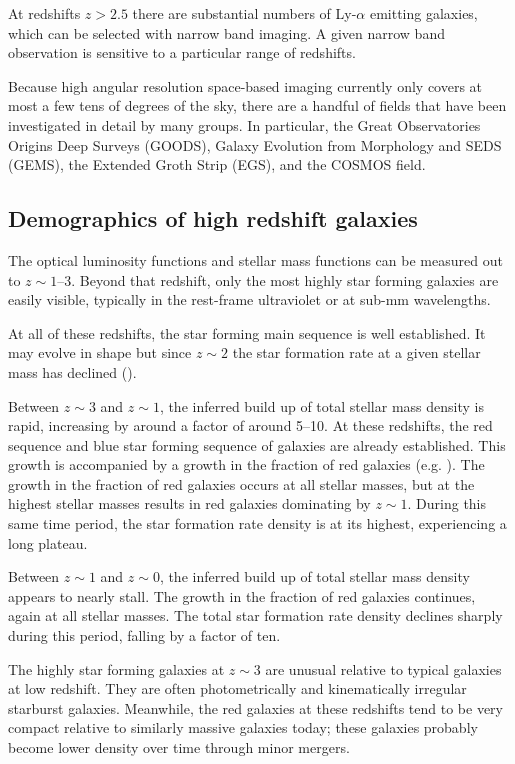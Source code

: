 At redshifts $z>2.5$ there are substantial numbers of Ly-$\alpha$
emitting galaxies, which can be selected with narrow band imaging. A
given narrow band observation is sensitive to a particular range of
redshifts. 

Because high angular resolution space-based imaging currently only
covers at most a few tens of degrees of the sky, there are a handful
of fields that have been investigated in detail by many groups. In
particular, the Great Observatories Origins Deep Surveys (GOODS),
Galaxy Evolution from Morphology and SEDS (GEMS), the Extended Groth
Strip (EGS), and the COSMOS field.

\subsection{Demographics of high redshift galaxies}

The optical luminosity functions and stellar mass functions can be
measured out to $z\sim 1$--3. Beyond that redshift, only the most
highly star forming galaxies are easily visible, typically in the
rest-frame ultraviolet or at sub-mm wavelengths.

At all of these redshifts, the star forming main sequence is well
established. It may evolve in shape but since $z\sim 2$ the star
formation rate at a given stellar mass has declined
(\citealt{whitaker14a}).

Between $z\sim 3$ and $z\sim 1$, the inferred build up of total
stellar mass density is rapid, increasing by around a factor of around
5--10. At these redshifts, the red sequence and blue star forming
sequence of galaxies are already established. This growth is
accompanied by a growth in the fraction of red galaxies
(e.g. \citealt{mortlock15a}). The growth in the fraction of red
galaxies occurs at all stellar masses, but at the highest stellar
masses results in red galaxies dominating by $z\sim 1$. During this
same time period, the star formation rate density is at its highest,
experiencing a long plateau.

Between $z\sim 1$ and $z\sim 0$, the inferred build up of total
stellar mass density appears to nearly stall. The growth in the
fraction of red galaxies continues, again at all stellar masses. The
total star formation rate density declines sharply during this period,
falling by a factor of ten.

The highly star forming galaxies at $z\sim 3$ are unusual relative to
typical galaxies at low redshift. They are often photometrically and
kinematically irregular starburst galaxies. Meanwhile, the red
galaxies at these redshifts tend to be very compact relative to
similarly massive galaxies today; these galaxies probably become lower
density over time through minor mergers.

